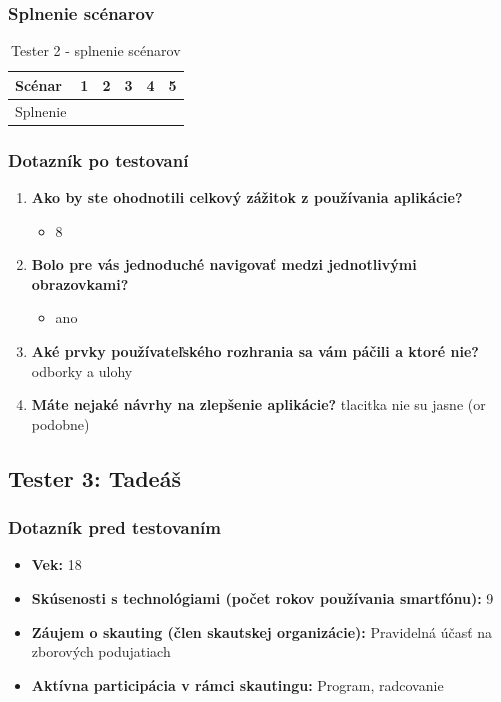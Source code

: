 \subsubsection*{Splnenie scénarov}
\begin{table}[h!]
    \centering
    \begin{tabular}{|l|p{1.5cm}|p{1.5cm}|p{1.5cm}|p{1.5cm}|p{1.5cm}|}
        \hline
        Scénar & 1 & 2 & 3 & 4 & 5 \\ \hline
        Splnenie & & & & & \\ \hline
    \end{tabular}
    \caption{Tester 2 - splnenie scénarov}
\end{table}

\subsubsection*{Dotazník po testovaní}
\begin{enumerate}[leftmargin=*]
    \item \textbf{Ako by ste ohodnotili celkový zážitok z používania aplikácie?}
    \begin{itemize}
        \item 8
    \end{itemize}
    \item \textbf{Bolo pre vás jednoduché navigovať medzi jednotlivými obrazovkami?}
    \begin{itemize}
        \item ano
    \end{itemize}
    \item \textbf{Aké prvky používateľského rozhrania sa vám páčili a ktoré nie?} odborky a ulohy
    \item \textbf{Máte nejaké návrhy na zlepšenie aplikácie?} tlacitka nie su jasne (or podobne)
\end{enumerate}

\subsection*{Tester 3: Tadeáš}
\subsubsection*{Dotazník pred testovaním}
\begin{itemize}[leftmargin=*]
    \item \textbf{Vek:} 18
    \item \textbf{Skúsenosti s technológiami (počet rokov používania smartfónu):} 9
    \item \textbf{Záujem o skauting (člen skautskej organizácie):} Pravidelná účasť na zborových podujatiach
    \item \textbf{Aktívna participácia v rámci skautingu:} Program, radcovanie
\end{itemize}

